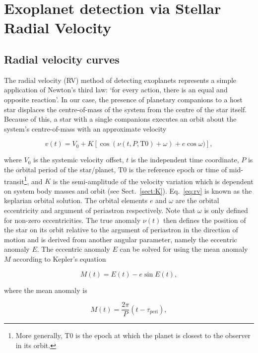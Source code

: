 \section{Exoplanet detection via Stellar Radial Velocity} \label{sect:RV}
\subsection{Radial velocity curves}
The radial velocity (RV) method of detecting exoplanets represents a simple 
application of Newton's third law: `for every action, there is an equal 
and opposite reaction'. In our case, the presence of planetary companions to a 
host star displaces the centre-of-mass of the system from the centre of the star 
itself. Because of this, a star with a single companions 
executes an orbit about the system's centre-of-mass 
with an approximate velocity 

\begin{equation}
v(t) = V_0 + K[\cos{(\nu(t,P,\mathrm{T}0) + \omega)} + e\cos{\omega})],
\label{eq:rv}
\end{equation}

\noindent where $V_0$ is the systemic velocity offset, 
$t$ is the independent time coordinate, $P$ is the orbital period of the star/planet, 
T0 is the reference epoch or time of mid-transit\footnote{More generally, T0 is the 
epoch at which the planet is closest to the observer in its orbit.}, 
and $K$ is the semi-amplitude of the velocity variation 
which is dependent on system body masses and orbit 
(see Sect.~\ref{sect:K}). Eq.~\ref{eq:rv} is known as the keplarian orbital 
solution. The orbital elements $e$ and $\omega$ are the orbital 
eccentricity and argument of periastron respectively. Note that $\omega$ is only 
defined for non-zero eccentricities. 
The true anomaly $\nu(t)$ then defines the position of the star on its orbit 
relative to the argument of periastron in the direction of motion and is derived 
from another angular parameter, namely the eccentric anomaly $E$. The eccentric 
anomaly $E$ can be solved for using the mean anomaly $M$ according to 
Kepler's equation

\begin{equation}
M(t) = E(t)-e\sin{E(t)},
\label{eq:kepler} 
\end{equation}

\noindent where the mean anomaly is

\begin{equation}
M(t) = \frac{2\pi}{P} (t-\tau_{\mathrm{peri}}), 
\end{equation}

